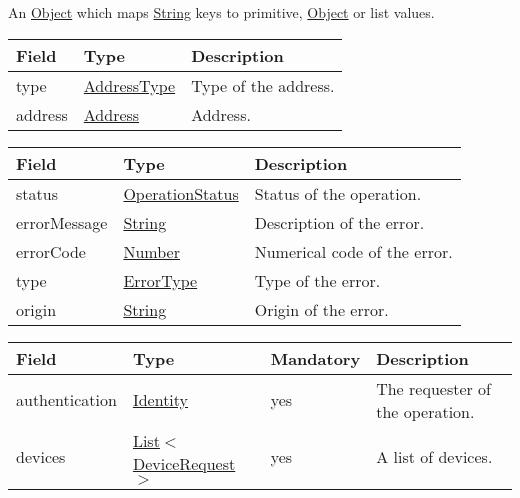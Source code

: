 \documentclass[a4paper]{arrowhead}
\newcommand{\pref}[1]{{\textcolor{ArrowheadGrey}{\hyperref[sec:model:primitives:#1]{#1}}}}
\begin{document}

An \pref{Object} which maps \pref{String} keys to primitive, \pref{Object} or list values.


\begin{table}[ht!]
\begin{tabularx}{\textwidth}{| p{2.5cm} | p{2.5cm} | X |} \hline
\rowcolor{gray!33} Field & Type & Description \\ \hline
type & \pref{AddressType} & Type of the address. \\ \hline
address & \pref{Address} & Address. \\ \hline
\end{tabularx}
\end{table}

\clearpage


\begin{table}[ht!]
\begin{tabularx}{\textwidth}{| p{2.5cm} | p{3cm} | X |} \hline
\rowcolor{gray!33} Field & Type      & Description \\ \hline
status & \pref{OperationStatus} & Status of the operation. \\ \hline
errorMessage & \pref{String} & Description of the error. \\ \hline
errorCode &\pref{Number}  & Numerical code of the error. \\ \hline
type & \pref{ErrorType} & Type of the error. \\ \hline
origin & \pref{String} & Origin of the error. \\ \hline
\end{tabularx}
\end{table}

 
\begin{table}[ht!]
\begin{tabularx}{\textwidth}{| p{2.5cm} | p{3.4cm} | p{2cm} | X |} \hline
\rowcolor{gray!33} Field & Type & Mandatory & Description \\ \hline
authentication & \hyperref[sec:model:Identity]{Identity} & yes & The requester of the operation. \\ \hline
devices & \pref{List}$<$\hyperref[sec:model:DeviceRequest]{DeviceRequest}$>$ & yes & A list of devices. \\ \hline
\end{tabularx}
\end{table}
\end{document}
